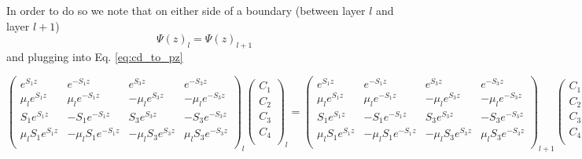 \documentclass[%
 reprint,
 amsmath,
 amssymb,
 aps,
 prl,
 lengthcheck,%
]{revtex4-1}
\begin{document}
In order to do so we note that on either side of a boundary (between layer $l$
and layer $l+1$)
\begin{equation}
\Psi(z)_l = \Psi(z)_{l+1}
\end{equation}
and plugging into Eq. \ref{eq:cd_to_pz}
\begin{widetext}
\begin{equation}
  \left(
  \begin{matrix}
    e^{S_1 z} & e^{-S_1 z} & e^{S_3 z} & e^{-S_3 z} \\
    \mu_l e^{S_1 z} & \mu_l e^{-S_1 z} & -\mu_l e^{S_3 z} & -\mu_l e^{-S_3 z} \\
    S_1 e^{S_1 z} & -S_1 e^{-S_1 z} & S_3 e^{S_3 z} & -S_3e^{-S_3 z} \\
    \mu_l S_1 e^{S_1 z} & -\mu_l S_1 e^{-S_1 z} & -\mu_l S_3 e^{S_3 z} & \mu_l S_3 e^{-S_3 z} \\
  \end{matrix}
  \right)_{\!\!l}\!\!\!
  \left(
  \begin{matrix}
    C_{1} \\
    C_{2} \\
    C_{3} \\
    C_{4} \\
  \end{matrix}
  \right)_{\!\!l}
  \!\!=\!\!
  \left(
  \begin{matrix}
    e^{S_1 z} & e^{-S_1 z} & e^{S_3 z} & e^{-S_3 z} \\
    \mu_l e^{S_1 z} & \mu_l e^{-S_1 z} & -\mu_l e^{S_3 z} & -\mu_l e^{-S_3 z} \\
    S_1 e^{S_1 z} & -S_1 e^{-S_1 z} & S_3 e^{S_3 z} & -S_3e^{-S_3 z} \\
    \mu_l S_1 e^{S_1 z} & -\mu_l S_1 e^{-S_1 z} & -\mu_l S_3 e^{S_3 z} & \mu_l S_3 e^{-S_3 z} \\
  \end{matrix}
  \right)_{\!\!l+1}\!\!\!\!\!
  \left(
  \begin{matrix}
    C_{1} \\
    C_{2} \\
    C_{3} \\
    C_{4} \\
  \end{matrix}
  \right)_{\!\!l+1}
\end{equation}



\end{widetext}
\end{document}
